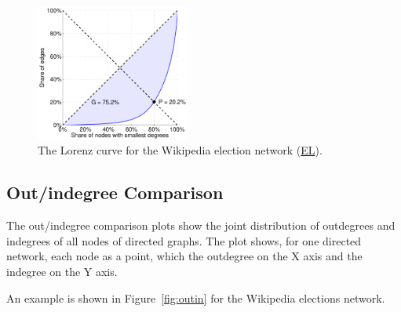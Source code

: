 \documentclass{article}
\newcommand{\wPlot}{0.45\textwidth}
\begin{document}
\begin{figure}
  \centering 
  \includegraphics[width=\wPlot]{plot/lorenz.a.elec}
  \caption{ 
    The Lorenz curve for the Wikipedia election network
    (\href{http://konect.uni-koblenz.de/networks/elec}{\textsf{EL}}).
    \label{fig:lorenz}
  }
\end{figure}

\subsection{Out/indegree Comparison}
The out/indegree comparison plots show the joint distribution of
outdegrees and indegrees of all nodes of directed graphs.  The plot
shows, for one directed network, each node as a point, which the
outdegree on the X axis and the indegree on the Y axis.  

An example is shown in Figure~\ref{fig:outin} for the Wikipedia
elections network. 
\end{document}
